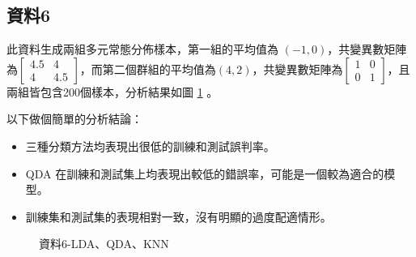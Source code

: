 \subsection{資料6}
此資料生成兩組多元常態分佈樣本，第一組的平均值為 $(-1, 0)$，共變異數矩陣為$\begin{bmatrix}4.5 & 4 \\4 & 4.5 \end{bmatrix}$，而第二個群組的平均值為$(4, 2)$，共變異數矩陣為$\begin{bmatrix}1 & 0 \\0 & 1 \end{bmatrix}$，且兩組皆包含200個樣本，分析結果如圖 \ref{fig:la6-LDAQDAKNN} 。

以下做個簡單的分析結論：
\begin{itemize}
\item 三種分類方法均表現出很低的訓練和測試誤判率。
\item QDA 在訓練和測試集上均表現出較低的錯誤率，可能是一個較為適合的模型。
\item 訓練集和測試集的表現相對一致，沒有明顯的過度配適情形。
\end{itemize}
\begin{table} [h]
\centering
    \caption{資料6之LDA、QDA、KNN錯判率}\label{tb:la6-LDAQDAKNN}
    \renewcommand\arraystretch{1.5}
\end{table}
 \vspace{30pt}
\begin{figure}[H]
    \caption{資料6-LDA、QDA、KNN}
    \label{fig:la6-LDAQDAKNN}
\end{figure}

